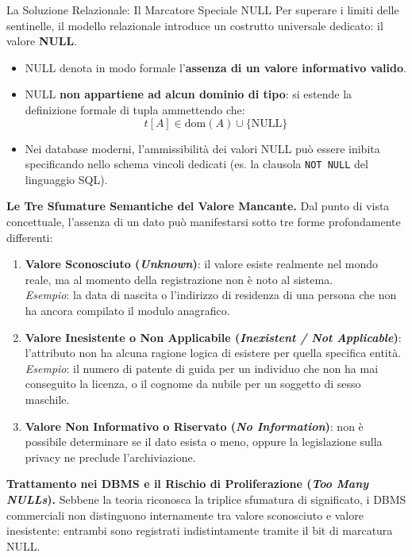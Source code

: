 \documentclass[12pt]{extarticle}
\begin{document}
\begin{cbox}{La Soluzione Relazionale: Il Marcatore Speciale NULL}
\noindent Per superare i limiti delle sentinelle, il modello relazionale introduce un costrutto universale dedicato: il valore \textbf{NULL}.
\begin{itemize}
    \item NULL denota in modo formale l'\textbf{assenza di un valore informativo valido}.
    \item NULL \textbf{non appartiene ad alcun dominio di tipo}: si estende la definizione formale di tupla ammettendo che:
    $$t[A] \in \text{dom}(A) \cup \{ \text{NULL} \}$$
    \item Nei database moderni, l'ammissibilità dei valori NULL può essere inibita specificando nello schema vincoli dedicati (es. la clausola \texttt{NOT NULL} del linguaggio SQL).
\end{itemize}
\end{cbox}

\medskip
\noindent \textbf{Le Tre Sfumature Semantiche del Valore Mancante.} Dal punto di vista concettuale, l'assenza di un dato può manifestarsi sotto tre forme profondamente differenti:
\begin{enumerate}
    \item \textbf{Valore Sconosciuto (\textit{Unknown})}: il valore esiste realmente nel mondo reale, ma al momento della registrazione non è noto al sistema. \\
    \textit{Esempio}: la data di nascita o l'indirizzo di residenza di una persona che non ha ancora compilato il modulo anagrafico.
    \item \textbf{Valore Inesistente o Non Applicabile (\textit{Inexistent / Not Applicable})}: l'attributo non ha alcuna ragione logica di esistere per quella specifica entità. \\
    \textit{Esempio}: il numero di patente di guida per un individuo che non ha mai conseguito la licenza, o il cognome da nubile per un soggetto di sesso maschile.
    \item \textbf{Valore Non Informativo o Riservato (\textit{No Information})}: non è possibile determinare se il dato esista o meno, oppure la legislazione sulla privacy ne preclude l'archiviazione.
\end{enumerate}

\medskip
\noindent \textbf{Trattamento nei DBMS e il Rischio di Proliferazione (\textit{Too Many NULLs}).} Sebbene la teoria riconosca la triplice sfumatura di significato, i DBMS commerciali non distinguono internamente tra valore sconosciuto e valore inesistente: entrambi sono registrati indistintamente tramite il bit di marcatura NULL.
\end{document}
